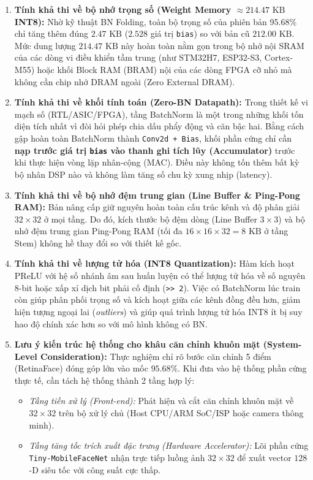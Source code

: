 \documentclass[11pt,a4paper]{article}
\begin{document}
\begin{enumerate}
    \item \textbf{Tính khả thi về bộ nhớ trọng số (Weight Memory $\approx 214.47\text{ KB}$ INT8):}
    Nhờ kỹ thuật BN Folding, toàn bộ trọng số của phiên bản 95.68\% chỉ tăng thêm đúng $2.47\text{ KB}$ ($2.528$ giá trị \texttt{bias}) so với bản cũ $212.00\text{ KB}$. Mức dung lượng $214.47\text{ KB}$ này hoàn toàn nằm gọn trong bộ nhớ nội SRAM của các dòng vi điều khiển tầm trung (như STM32H7, ESP32-S3, Cortex-M55) hoặc khối Block RAM (BRAM) nội của các dòng FPGA cỡ nhỏ mà không cần chip nhớ DRAM ngoài (Zero External DRAM).

    \item \textbf{Tính khả thi về khối tính toán (Zero-BN Datapath):}
    Trong thiết kế vi mạch số (RTL/ASIC/FPGA), tầng BatchNorm là một trong những khối tốn diện tích nhất vì đòi hỏi phép chia dấu phẩy động và căn bậc hai. Bằng cách gập hoàn toàn BatchNorm thành \texttt{Conv2d + Bias}, khối phần cứng chỉ cần \textbf{nạp trước giá trị \texttt{bias} vào thanh ghi tích lũy (Accumulator)} trước khi thực hiện vòng lặp nhân-cộng (MAC). Điều này không tốn thêm bất kỳ bộ nhân DSP nào và không làm tăng số chu kỳ xung nhịp (latency).

    \item \textbf{Tính khả thi về bộ nhớ đệm trung gian (Line Buffer \& Ping-Pong RAM):}
    Bản nâng cấp giữ nguyên hoàn toàn cấu trúc kênh và độ phân giải $32 \times 32$ ở mọi tầng. Do đó, kích thước bộ đệm dòng (Line Buffer $3 \times 3$) và bộ nhớ đệm trung gian Ping-Pong RAM (tối đa $16 \times 16 \times 32 = 8\text{ KB}$ ở tầng Stem) không hề thay đổi so với thiết kế gốc.

    \item \textbf{Tính khả thi về lượng tử hóa (INT8 Quantization):}
    Hàm kích hoạt PReLU với hệ số nhánh âm sau huấn luyện có thể lượng tử hóa về số nguyên 8-bit hoặc xấp xỉ dịch bit phải cố định (\texttt{>> 2}). Việc có BatchNorm lúc train còn giúp phân phối trọng số và kích hoạt giữa các kênh đồng đều hơn, giảm hiện tượng ngoại lai (\textit{outliers}) và giúp quá trình lượng tử hóa INT8 ít bị suy hao độ chính xác hơn so với mô hình không có BN.

    \item \textbf{Lưu ý kiến trúc hệ thống cho khâu căn chỉnh khuôn mặt (System-Level Consideration):}
    Thực nghiệm chỉ rõ bước căn chỉnh 5 điểm (RetinaFace) đóng góp lớn vào mốc $95.68\%$. Khi đưa vào hệ thống phần cứng thực tế, cần tách hệ thống thành 2 tầng hợp lý:
    \begin{itemize}
        \item \textit{Tầng tiền xử lý (Front-end):} Phát hiện và cắt căn chỉnh khuôn mặt về $32 \times 32$ trên bộ xử lý chủ (Host CPU/ARM SoC/ISP hoặc camera thông minh).
        \item \textit{Tầng tăng tốc trích xuất đặc trưng (Hardware Accelerator):} Lõi phần cứng \texttt{Tiny-MobileFaceNet} nhận trực tiếp luồng ảnh $32 \times 32$ để xuất vector $128$-D siêu tốc với công suất cực thấp.
    \end{itemize}
\end{enumerate}
\end{document}
